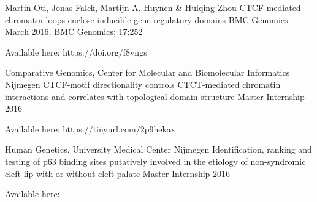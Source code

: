 

\begin{cventries}

\cventry
  {Martin Oti, Jonas Falck, Martijn A. Huynen \& Huiqing Zhou}
  {CTCF-mediated chromatin loops enclose inducible gene regulatory domains} %
  {BMC Genomics}
  {March 2016, BMC Genomics; 17:252} %
  {    
  \begin{cvitems} %
    \item {Available here: https://doi.org/f8vngs}
  \end{cvitems}
  }

\cventry
  {Comparative Genomics,  Center for Molecular and Biomolecular Informatics Nijmegen} %
  {CTCF-motif directionality controls CTCT-mediated chromatin interactions and correlates with topological domain structure} %
  {Master Internship} %
  {2016} %
  {
    \begin{cvitems} %
      \item {Available here: https://tinyurl.com/2p9hekax}
    \end{cvitems}
  }
  
\cventry
  {Human Genetics, University Medical Center Nijmegen} %
  {Identification, ranking and testing of p63 binding sites putatively involved in the etiology of non-syndromic cleft lip with or without cleft palate} %
  {Master Internship} %
  {2016} %
  {
    \begin{cvitems} %
      \item {Available here: }
    \end{cvitems}
  }

\end{cventries}
